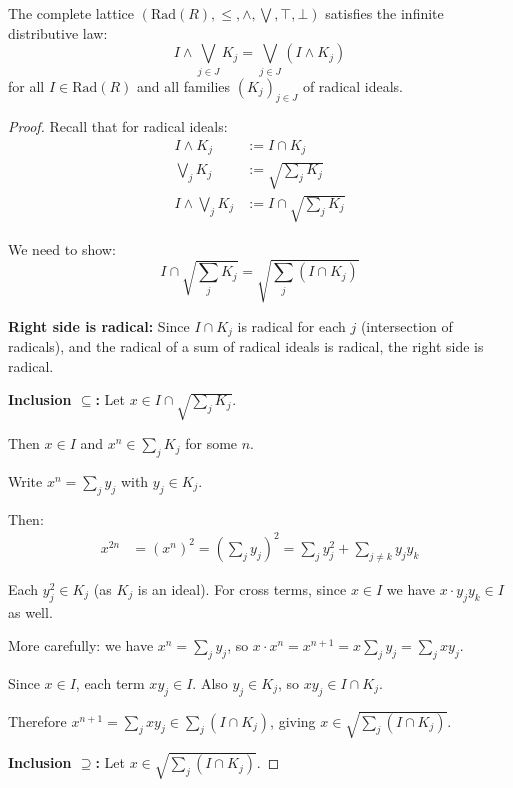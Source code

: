\begin{theorem}
  \label{thm:radical-frame-distributivity}
  \leanok
  The complete lattice $(\mathrm{Rad}(R), \leq, \land, \bigvee, \top, \bot)$ satisfies the infinite distributive law:
  $$I \land \bigvee_{j \in J} K_j = \bigvee_{j \in J} (I \land K_j)$$
  for all $I \in \mathrm{Rad}(R)$ and all families $(K_j)_{j \in J}$ of radical ideals.
\end{theorem}

\begin{proof}
  \leanok
  Recall that for radical ideals:
  \begin{align*}
    I \land K_j &:= I \cap K_j \\
    \bigvee_j K_j &:= \sqrt{\sum_j K_j} \\
    I \land \bigvee_j K_j &:= I \cap \sqrt{\sum_j K_j}
  \end{align*}
  
  We need to show:
  $$I \cap \sqrt{\sum_j K_j} = \sqrt{\sum_j (I \cap K_j)}$$
  
  \textbf{Right side is radical:} Since $I \cap K_j$ is radical for each $j$ (intersection of radicals), 
  and the radical of a sum of radical ideals is radical, the right side is radical.
  
  \textbf{Inclusion $\subseteq$:} Let $x \in I \cap \sqrt{\sum_j K_j}$.
  
  Then $x \in I$ and $x^n \in \sum_j K_j$ for some $n$.
  
  Write $x^n = \sum_j y_j$ with $y_j \in K_j$.
  
  Then:
  \begin{align*}
    x^{2n} &= (x^n)^2 = (\sum_j y_j)^2 = \sum_j y_j^2 + \sum_{j \neq k} y_j y_k
  \end{align*}
  
  Each $y_j^2 \in K_j$ (as $K_j$ is an ideal). For cross terms, since $x \in I$ we have $x \cdot y_j y_k \in I$ as well.
  
  More carefully: we have $x^n = \sum_j y_j$, so $x \cdot x^n = x^{n+1} = x \sum_j y_j = \sum_j x y_j$.
  
  Since $x \in I$, each term $xy_j \in I$. Also $y_j \in K_j$, so $xy_j \in I \cap K_j$.
  
  Therefore $x^{n+1} = \sum_j xy_j \in \sum_j (I \cap K_j)$, giving $x \in \sqrt{\sum_j(I \cap K_j)}$.
  
  \textbf{Inclusion $\supseteq$:} Let $x \in \sqrt{\sum_j (I \cap K_j)}$.
  

\end{proof}
